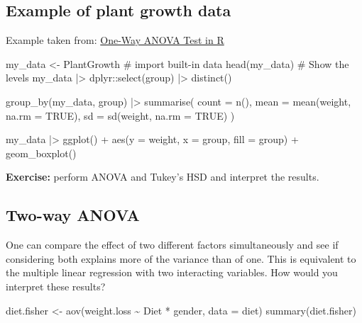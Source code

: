 \documentclass[
  letterpaper,
  DIV=11,
  numbers=noendperiod]{scrreprt}
\newenvironment{Shaded}{\begin{snugshade}}{\end{snugshade}}
\newcommand{\NormalTok}[1]{\textcolor[rgb]{0.00,0.23,0.31}{#1}}
\begin{document}
\subsection{Example of plant growth
data}\label{example-of-plant-growth-data}

Example taken from:
\href{http://www.sthda.com/english/wiki/one-way-anova-test-in-r}{One-Way
ANOVA Test in R}

\begin{Shaded}
\begin{Highlighting}[]
\NormalTok{my\_data \textless{}{-} PlantGrowth \# import built{-}in data}
\NormalTok{head(my\_data)}
\NormalTok{\# Show the levels}
\NormalTok{my\_data |\textgreater{} dplyr::select(group) |\textgreater{} distinct()}
\end{Highlighting}
\end{Shaded}

\begin{Shaded}
\begin{Highlighting}[]
\NormalTok{group\_by(my\_data, group) |\textgreater{}}
\NormalTok{  summarise(}
\NormalTok{    count = n(),}
\NormalTok{    mean = mean(weight, na.rm = TRUE),}
\NormalTok{    sd = sd(weight, na.rm = TRUE)}
\NormalTok{  )}
\end{Highlighting}
\end{Shaded}

\begin{Shaded}
\begin{Highlighting}[]
\NormalTok{my\_data |\textgreater{} }
\NormalTok{  ggplot() + }
\NormalTok{  aes(y = weight, x = group, }
\NormalTok{      fill = group) + }
\NormalTok{  geom\_boxplot()}
\end{Highlighting}
\end{Shaded}

\textbf{Exercise:} perform ANOVA and Tukey's HSD and interpret the
results.

\subsection{Two-way ANOVA}\label{two-way-anova}

One can compare the effect of two different factors simultaneously and
see if considering both explains more of the variance than of one. This
is equivalent to the multiple linear regression with two interacting
variables. How would you interpret these results?

\begin{Shaded}
\begin{Highlighting}[]
\NormalTok{diet.fisher \textless{}{-} aov(weight.loss \textasciitilde{} Diet * gender, data = diet)}
\NormalTok{summary(diet.fisher)}
\end{Highlighting}
\end{Shaded}
\end{document}
